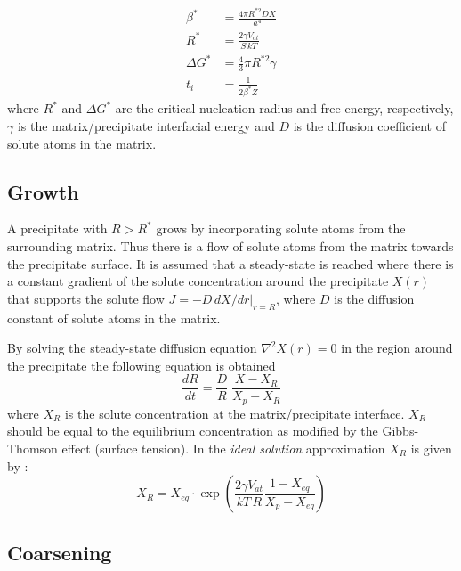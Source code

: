 \documentclass[12pt,a4paper]{article}
\begin{document}
\begin{subequations}
	\begin{align}
\beta^* &= \frac{4\pi R^{*2} D X}{a^4} \\
R^* &= \frac{2\gamma V_{at}}{S\,kT} \\
\Delta G^* &= \frac{4}{3}\pi R^{*2}\gamma \\
t_i &= \frac{1}{2\beta^* Z} 
	\end{align}	
\end{subequations}
where $R^*$ and $\Delta G^*$ are the critical nucleation radius and free energy, respectively, $\gamma$ is the matrix/precipitate interfacial energy and $D$ is the diffusion coefficient of solute atoms in the matrix.


\subsection{Growth}

A precipitate with $R>R^*$ grows by incorporating solute atoms from the surrounding matrix. Thus there is a flow of solute atoms from the matrix towards the precipitate surface. It is assumed that a steady-state is reached where there is a constant gradient of the solute concentration around the precipitate $X(r)$ that supports the solute flow $J = -D\,dX/dr |_{r=R}$, where $D$ is the diffusion constant of solute atoms in the matrix.

By solving the steady-state diffusion equation $\nabla^2 X(r)=0$ in the region around the precipitate the following equation is obtained
\begin{equation}
\frac{dR}{dt} = \frac{D}{R} \; \frac{X-X_R}{X_p-X_R}
\label{eq:growth}
\end{equation}
where $X_R$ is the solute concentration at the matrix/precipitate interface.
$X_R$ should be equal to the equilibrium concentration as modified by the Gibbs-Thomson effect (surface tension). In the \textit{ideal solution} approximation $X_R$ is given by \citep{Calderon-1994-Ostwaldripeningin}:
\begin{equation}
X_R =  X_{eq} \cdot \exp \left( \frac{2\gamma V_{at}}{kT\, R} \frac{1-X_{eq}}{X_p - X_{eq}}\right) 
\end{equation}

\subsection{Coarsening}
\end{document}
